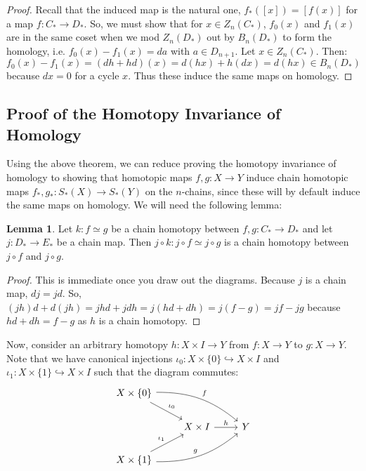\documentclass[11pt, oneside]{amsart}   	%
\theoremstyle{definition}
\newtheorem{lemma}[theorem]{Lemma}
\begin{document}
\begin{proof}
	Recall that the induced map is the natural one, $f_*([x]) = [f(x)]$ for a map $f : C_*\rightarrow D_*$. So, we must 
	show that for $x\in Z_n(C_*)$, $f_0(x)$ and $f_1(x)$ are in the same coset when we mod $Z_n(D_*)$ out by 
	$B_n(D_*)$ to form the homology, i.e. $f_0(x) - f_1(x) = da$ with $a\in D_{n + 1}$. Let $x\in Z_n(C_*)$. Then:
	\begin{equation}
		f_0(x) - f_1(x) = (dh + hd)(x) = d(hx) + h(dx) = d(hx)\in B_n(D_*)
	\end{equation}
	because $dx = 0$ for a cycle $x$. Thus these induce the same maps on homology. 
\end{proof}

\subsection{Proof of the Homotopy Invariance of Homology}
Using the above theorem, we can reduce proving the homotopy invariance of homology to showing that homotopic maps 
$f, g : X\rightarrow Y$ induce chain homotopic maps $f_*, g_* : S_*(X)\rightarrow S_*(Y)$ on the $n$-chains, since these will 
by default induce the same maps on homology. We will need the following lemma:
\begin{lemma}
	Let $k : f\simeq g$ be a chain homotopy between $f, g : C_*\rightarrow D_*$ and let $j : D_*\rightarrow E_*$ 
	be a chain map. Then $j\circ k : j\circ f\simeq j\circ g$ is a chain homotopy between $j\circ f$ and $j\circ g$. 
\end{lemma}
\begin{proof}
	This is immediate once you draw out the diagrams. Because $j$ is a chain map, $dj = jd$. So, $(jh)d + d(jh) = 
	jhd + jdh = j(hd + dh) = j(f - g) = jf - jg$ because $hd + dh = f - g$ as $h$ is a chain homotopy. 
\end{proof}

Now, consider an arbitrary homotopy $h : X\times I\rightarrow Y$ from $f : X\rightarrow Y$ to $g : X\rightarrow Y$. Note 
that we have canonical injections $\iota_0 : X\times\{0\}\hookrightarrow X\times I$ and $\iota_1 : X\times \{1\}\hookrightarrow 
X\times I$ such that the diagram commutes:
\begin{equation}\begin{tikzcd}
	X\times\{0\} \arrow[dr, "\iota_0"] \arrow[drr, "f", bend left=20]&  &  \\
	& X\times I\arrow[r, "h"] & Y \\
	X\times \{1\} \arrow[ur, "\iota_1"] \arrow[urr, "g", bend right=20] & &
\end{tikzcd}\end{equation}
\end{document}
